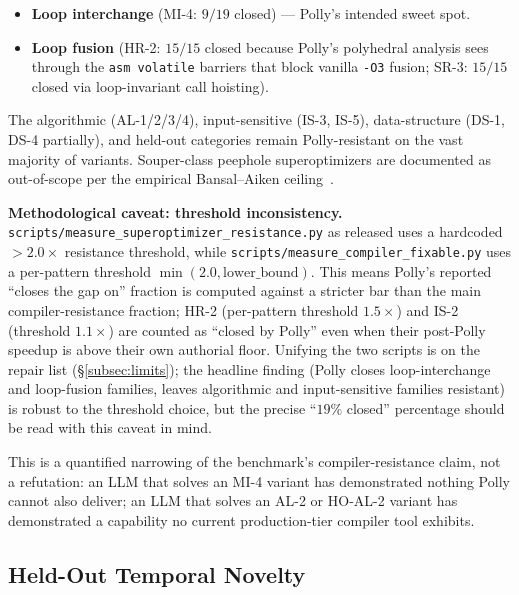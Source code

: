 \begin{itemize}
\item \textbf{Loop interchange} (MI-4: $9/19$ closed) --- Polly's intended sweet spot.
\item \textbf{Loop fusion} (HR-2: $15/15$ closed because Polly's polyhedral analysis sees through the \texttt{asm volatile} barriers that block vanilla \texttt{-O3} fusion; SR-3: $15/15$ closed via loop-invariant call hoisting).
\end{itemize}

The algorithmic (AL-1/2/3/4), input-sensitive (IS-3, IS-5), data-structure (DS-1, DS-4 partially), and held-out categories remain Polly-resistant on the vast majority of variants. Souper-class peephole superoptimizers are documented as out-of-scope per the empirical Bansal--Aiken ceiling~\cite{bansal2006gso}.

\textbf{Methodological caveat: threshold inconsistency.} \texttt{scripts/measure\_superoptimizer\_resistance.py} as released uses a hardcoded $> 2.0\times$ resistance threshold, while \texttt{scripts/measure\_compiler\_fixable.py} uses a per-pattern threshold $\min(2.0, \text{lower\_bound})$. This means Polly's reported ``closes the gap on'' fraction is computed against a stricter bar than the main compiler-resistance fraction; HR-2 (per-pattern threshold $1.5\times$) and IS-2 (threshold $1.1\times$) are counted as ``closed by Polly'' even when their post-Polly speedup is above their own authorial floor. Unifying the two scripts is on the repair list (\S\ref{subsec:limits}); the headline finding (Polly closes loop-interchange and loop-fusion families, leaves algorithmic and input-sensitive families resistant) is robust to the threshold choice, but the precise ``$19\%$ closed'' percentage should be read with this caveat in mind.

This is a quantified narrowing of the benchmark's compiler-resistance claim, not a refutation: an LLM that solves an MI-4 variant has demonstrated nothing Polly cannot also deliver; an LLM that solves an AL-2 or HO-AL-2 variant has demonstrated a capability no current production-tier compiler tool exhibits.

\subsection{Held-Out Temporal Novelty}\label{subsec:results-heldout}

